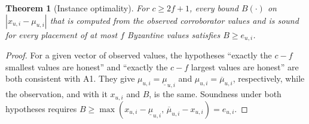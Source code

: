 \documentclass[journal]{IEEEtran}
\newtheorem{theorem}{Theorem}
\theoremstyle{remark}
\begin{document}
\begin{theorem}[Instance optimality]\label{thm:opt}
For $c\ge 2f+1$, every bound $B(\cdot)$ on $|x_{u,i}-\mu_{u,i}|$ that is computed from the observed corroborator values and is sound for every placement of at most $f$ Byzantine values satisfies $B\ge e_{u,i}$.
\end{theorem}
\begin{proof}
For a given vector of observed values, the hypotheses ``exactly the $c-f$ smallest values are honest'' and ``exactly the $c-f$ largest values are honest'' are both consistent with A1. They give $\mu_{u,i}=\underline{\mu}_{u,i}$ and $\mu_{u,i}=\overline{\mu}_{u,i}$, respectively, while the observation, and with it $x_{u,i}$ and $B$, is the same. Soundness under both hypotheses requires $B\ge\max(x_{u,i}-\underline{\mu}_{u,i},\,\overline{\mu}_{u,i}-x_{u,i})=e_{u,i}$.
\end{proof}
\end{document}
